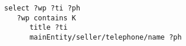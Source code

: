 
{\footnotesize
\begin{verbatim}
select ?wp ?ti ?ph
   ?wp contains K
      title ?ti
      mainEntity/seller/telephone/name ?ph
\end{verbatim}
}